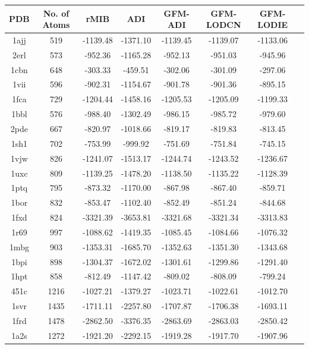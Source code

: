 \begin{table}[!ht]
\centering
\begin{tabular}{ c c c c c c c c}
\hline
\scriptsize{PDB} & \scriptsize{No. of Atoms}& \scriptsize{rMIB}   &   \scriptsize{ADI}    &  \scriptsize{GFM-ADI}  & \scriptsize{GFM-LODCN} & \scriptsize{GFM-LODIE}\\ \hline
1ajj & 519  & -1139.48 & -1371.10 & -1139.45 & -1139.07 & -1133.06 \\
2erl & 573  & -952.36  & -1165.28 & -952.13  & -951.03  & -945.96  \\
1cbn & 648  & -303.33  & -459.51  & -302.06  & -301.09  & -297.06  \\
1vii & 596  & -902.31  & -1154.67 & -901.78  & -901.36  & -895.15  \\
1fca & 729  & -1204.44 & -1458.16 & -1205.53 & -1205.09 & -1199.33 \\
1bbl & 576  & -988.40  & -1302.49 & -986.15  & -985.72  & -979.60  \\
2pde & 667  & -820.97  & -1018.66 & -819.17  & -819.83  & -813.45  \\
1sh1 & 702  & -753.99  & -999.92  & -751.69  & -751.84  & -745.15  \\
1vjw & 826  & -1241.07 & -1513.17 & -1244.74 & -1243.52 & -1236.67 \\
1uxc & 809  & -1139.25 & -1478.20 & -1138.50 & -1135.22 & -1128.39 \\
1ptq & 795  & -873.32  & -1170.00 & -867.98  & -867.40  & -859.71  \\
1bor & 832  & -853.47  & -1102.40 & -852.49  & -851.24  & -844.68  \\
1fxd & 824  & -3321.39 & -3653.81 & -3321.68 & -3321.34 & -3313.83 \\
1r69 & 997  & -1088.62 & -1419.35 & -1085.45 & -1084.66 & -1076.32 \\
1mbg & 903  & -1353.31 & -1685.70 & -1352.63 & -1351.30 & -1343.68 \\
1bpi & 898  & -1304.37 & -1672.02 & -1301.61 & -1299.86 & -1291.40 \\
1hpt & 858  & -812.49  & -1147.42 & -809.02  & -808.09  & -799.24  \\
451c & 1216 & -1027.21 & -1379.27 & -1023.71 & -1022.61 & -1012.70 \\
1svr & 1435 & -1711.11 & -2257.80 & -1707.87 & -1706.38 & -1693.11 \\
1frd & 1478 & -2862.50 & -3376.35 & -2863.69 & -2863.03 & -2850.42 \\
1a2s & 1272 & -1921.20 & -2292.15 & -1919.28 & -1917.70 & -1907.96 \\

\end{tabular}
\end{table}
